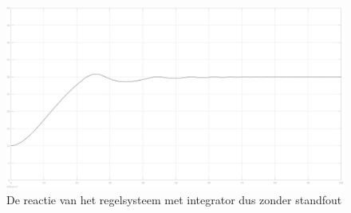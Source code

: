 \documentclass[a4paper, 12pt]{article}
\begin{document}
\begin{figure}[!h]
	\includegraphics[width=1\linewidth]{Labo4_1_temperatuur_no_stand_fout.jpg}
	\caption{De reactie van het regelsysteem met integrator dus zonder standfout}
\end{figure}
\end{document}
